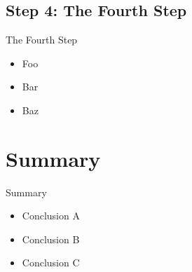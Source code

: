 \documentclass{beamer}
\begin{document}
\subsection{Step 4: The Fourth Step}

\begin{frame}{The Fourth Step}

  \begin{itemize}
    \item
      Foo
    \item
      Bar
    \item
      Baz
  \end{itemize}

\end{frame}


\section*{Summary}

\begin{frame}{Summary}

  \begin{itemize}
  \item
    Conclusion A
  \item
    Conclusion B
  \item
    Conclusion C
  \end{itemize}

\end{frame}
\end{document}
